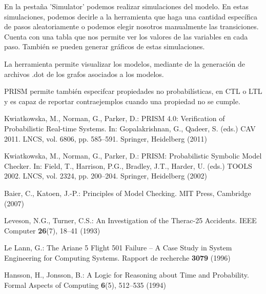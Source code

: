 \documentclass[runningheads]{llncs}
\begin{document}
En la pestaña 'Simulator' podemos realizar simulaciones del modelo. En estas simulaciones, podemos decirle a la herramienta que haga una cantidad específica de pasos aleatoriamente o podemos elegir nosotros manualmente las transiciones. Cuenta con una tabla que nos permite ver los valores de las variables en cada paso. También se pueden generar gráficos de estas simulaciones.

La herramienta permite visualizar los modelos, mediante de la generación de archivos .dot de los grafos asociados a los modelos.

PRISM permite también especifcar propiedades no probabilísticas, en CTL o LTL y es capaz de reportar contraejemplos cuando una propiedad no se cumple.


\begin{thebibliography}{8}

Kwiatkowska, M., Norman, G., Parker, D.: PRISM 4.0: Verification of Probabilistic Real-time Systems. In: Gopalakrishnan, G., Qadeer, S. (eds.) CAV 2011. LNCS, vol. 6806, pp. 585--591. Springer, Heidelberg (2011)

Kwiatkowska, M., Norman, G., Parker, D.: PRISM: Probabilistic Symbolic Model Checker. In: Field, T., Harrison, P.G., Bradley, J.T., Harder, U. (eds.) TOOLS 2002. LNCS, vol. 2324, pp. 200--204. Springer, Heidelberg (2002)

Baier, C., Katoen, J.-P.: Principles of Model Checking. MIT Press, Cambridge (2007)

Leveson, N.G., Turner, C.S.: An Investigation of the Therac-25 Accidents. IEEE Computer \textbf{26}(7), 18--41 (1993)

Le Lann, G.: The Ariane 5 Flight 501 Failure -- A Case Study in System Engineering for Computing Systems. Rapport de recherche \textbf{3079} (1996)

Hansson, H., Jonsson, B.: A Logic for Reasoning about Time and Probability. Formal Aspects of Computing \textbf{6}(5), 512--535 (1994)

\end{thebibliography}
\end{document}
